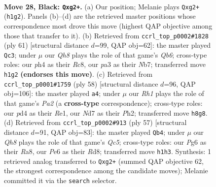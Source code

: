 \documentclass[11pt]{article}
\begin{document}
\clearpage

\begin{figure}[p]\centering
\begin{subfigure}{0.46\textwidth}\centering
\resizebox{\linewidth}{!}{%
\newchessgame
\chessboard[
  setfen={r6r/3nk2p/1pp1p1p1/8/1p1P3P/P3PRb1/RP2K1N1/2BQ3q b - - 8 28},
  showmover=false,
  pgfstyle=straightmove, color=movearrow, markmove={h1-g2}
]}
\caption{}
\end{subfigure}\hfill
\begin{subfigure}{0.46\textwidth}\centering
\resizebox{\linewidth}{!}{%
\newchessgame
\chessboard[
  setfen={2rr2k1/1n3pp1/p6p/4p3/1pP1P3/1q1PB2P/4QPP1/1R1R2K1 b - - 1 31},
  showmover=false,
  pgfstyle=straightmove, color=movearrow, markmove={b3-c3}
]}
\caption{}
\end{subfigure}
\\[4pt]
\begin{subfigure}{0.46\textwidth}\centering
\resizebox{\linewidth}{!}{%
\newchessgame
\chessboard[
  setfen={7k/Q1b2qp1/3Br2p/1r2pp2/2Np1n2/3P2P1/P6P/R3R1K1 w - - 0 30},
  showmover=false,
  pgfstyle=straightmove, color=movearrow, markmove={a2-a4}
]}
\caption{}
\end{subfigure}\hfill
\begin{subfigure}{0.46\textwidth}\centering
\resizebox{\linewidth}{!}{%
\newchessgame
\chessboard[
  setfen={r2r4/5pbk/4p1p1/7p/P1qn4/2N4P/RP1R1PP1/2B2QK1 b - - 12 29},
  showmover=false,
  pgfstyle=straightmove, color=movearrow, markmove={c4-b4}
]}
\caption{}
\end{subfigure}
\caption{\textbf{Move 28, Black: \texttt{Qxg2+}.} (a) Our position; Melanie plays \texttt{Qxg2+} (\texttt{h1g2}). Panels (b)--(d) are the retrieved master positions whose correspondence most drove this move (highest QAP objective among those that transfer to it). (b) Retrieved from \texttt{ccrl\_top\_p0002\#1828} (ply 61) [structural distance $d$=99, QAP obj=62]: the master played \texttt{Qc3}; under $\mu$ our \emph{Qh8} plays the role of that game's \emph{Qb6}; cross-type roles: our \emph{p}h4 as their \emph{R}c8, our \emph{p}a3 as their \emph{N}b7; transferred move \texttt{h1g2} \textbf{(endorses this move)}. (c) Retrieved from \texttt{ccrl\_top\_p0001\#1759} (ply 58) [structural distance $d$=96, QAP obj=106]: the master played \texttt{a4}; under $\mu$ our \emph{Rh1} plays the role of that game's \emph{Pa2} (a \textbf{cross-type} correspondence); cross-type roles: our \emph{p}d4 as their \emph{R}e1, our \emph{N}d7 as their \emph{P}h2; transferred move \texttt{h8g8}. (d) Retrieved from \texttt{ccrl\_top\_p0002\#913} (ply 57) [structural distance $d$=91, QAP obj=83]: the master played \texttt{Qb4}; under $\mu$ our \emph{Qh8} plays the role of that game's \emph{Qc5}; cross-type roles: our \emph{P}g6 as their \emph{R}a8, our \emph{P}e6 as their \emph{R}d8; transferred move \texttt{h1h3}. Synthesis: 1 retrieved analog transferred to \texttt{Qxg2+} (summed QAP objective 62, the strongest correspondence among the candidate moves); Melanie committed it via the \texttt{search} selector.}
\label{fig:thought-m55}
\end{figure}
\end{document}
